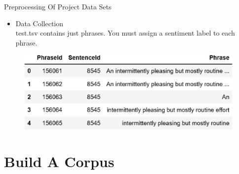 \documentclass[
 size=14pt,
 paper=smartboard,  %
 mode=present, 		%
 display=slides, 	%
 style=tuliplab,  	%
 pauseslide,
 fleqn,leqno]{powerdot}
\begin{document}
\begin{slide}{Preprocessing Of Project Data Sets}
  \begin{itemize}
    \item Data Collection 
    \\test.tsv contains just phrases. You must assign a sentiment label to each phrase.
  \end{itemize}
    \begin{figure}[htbp]
      \centering
      \begin{minipage}[t]{0.58\textwidth}
        \centering
        \includegraphics[width=1.2\textwidth]{logos/test.eps}
        \vspace{0.4em}
      \end{minipage}
    \end{figure}
  \bigskip
\end{slide}

\section{Build A Corpus}


\end{document}

